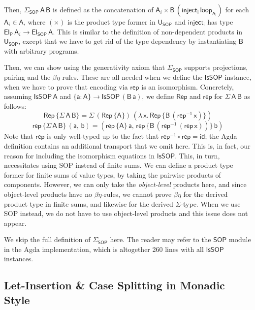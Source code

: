 \documentclass[acmsmall,screen,review,anonymous]{acmart}
\newcommand{\mit}[1]{{\mathsf{#1}}}
\newcommand{\msf}[1]{{\mathsf{#1}}}
\newcommand{\lam}{\lambda\,}
\newcommand{\vA}{\mathsf{A}}
\newcommand{\vB}{\mathsf{B}}
\newcommand{\va}{\mathsf{a}}
\newcommand{\vb}{\mathsf{b}}
\newcommand{\vx}{\mathsf{x}}
\newcommand{\SOP}{\msf{SOP}}
\newcommand{\El}{\msf{El}}
\newcommand{\USOP}{\msf{U}_{\msf{SOP}}}
\newcommand{\Elprod}{\msf{El_{P}}}
\newcommand{\IsSOP}{\msf{IsSOP}}
\newcommand{\rep}{\msf{rep}}
\theoremstyle{remark}
\newcommand{\id}{\mit{id}}
\newcommand{\Rep}{\mit{Rep}}
\begin{document}
Then, $\Sigma_\SOP\,\vA\,\vB$ is defined as the concatenation of $\vA_i \times
\vB\,(\msf{inject_i}\,\msf{loop_{\vA_i}})$ for each $\vA_i \in \vA$, where
$({\times})$ is the product type former in $\USOP$ and $\msf{inject_i}$
has type $\Elprod\,\vA_i \to \El_\SOP\,\vA$. This is similar to the definition of
non-dependent products in $\USOP$, except that we have to get rid of the type
dependency by instantiating $\vB$ with arbitrary programs.

Then, we can show using the generativity axiom that $\Sigma_\SOP$ supports
projections, pairing and the $\beta\eta$-rules. These are all needed when we
define the $\IsSOP$ instance, when we have to prove that encoding via $\rep$
is an isomorphism. Concretely, assuming $\IsSOP\,\vA$ and $\{\va : \vA\} \to
\IsSOP\,(\vB\,\va)$, we define $\Rep$ and $\msf{rep}$ for $\Sigma\,\vA\,\vB$ as follows:
\[ \Rep\,\{\Sigma\,\vA\,\vB\} = \Sigma\,(\Rep\,\{\vA\})\,(\lam \vx.\,\Rep\,\{\vB\,(\rep^{-1}\,\vx)\}) \]
\[  \rep\,\{\Sigma\,\vA\,\vB\}\,(\va,\,\vb) = (\rep\,\{\vA\}\,\va,\,\rep\,\{\vB\,(\rep^{-1}\,(\rep\,\vx))\}\,\vb) \]
Note that $\rep$ is only well-typed up to the fact that $\rep^{-1} \circ \rep =
\id$; the Agda definition contains an additional transport that we omit here.
This is, in fact, our reason for including the isomorphism equations in
$\IsSOP$. This, in turn, necessitates using SOP instead of finite sums. We can
define a product type former for finite sums of value types, by taking the
pairwise products of components. However, we can only take the
\emph{object-level} products here, and since object-level products have no
$\beta\eta$-rules, we cannot prove $\beta\eta$ for the derived product type in
finite sums, and likewise for the derived $\Sigma$-type. When we use SOP
instead, we do not have to use object-level products and this issue does not
appear.

We skip the full definition of $\Sigma_\SOP$ here. The reader may refer
to the $\SOP$ module in the Agda implementation, which is altogether 260 lines with
all $\IsSOP$ instances.

\subsection{Let-Insertion \& Case Splitting in Monadic Style}
\end{document}
